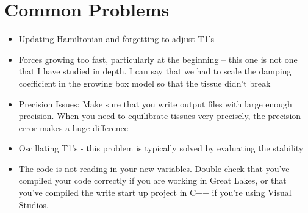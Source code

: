\documentclass[12pt,a4paper]{article}
\begin{document}
\section{Common Problems}
\begin{itemize}
	\item Updating Hamiltonian and forgetting to adjust T1's
	\item Forces growing too fast, particularly at the beginning -- this one is not one that I have studied in depth. I can say that we had to scale the damping coefficient in the growing box model so that the tissue didn't break
	\item Precision Issues: Make sure that you write output files with large enough precision. When you need to equilibrate tissues very precisely, the precision error makes a huge difference
	\item Oscillating T1's - this problem is typically solved by evaluating the stability
	\item The code is not reading in your new variables. Double check that you've compiled your code correctly if you are working in Great Lakes, or that you've compiled the write start up project in C++ if you're using Visual Studios. 
\end{itemize}
\end{document}

